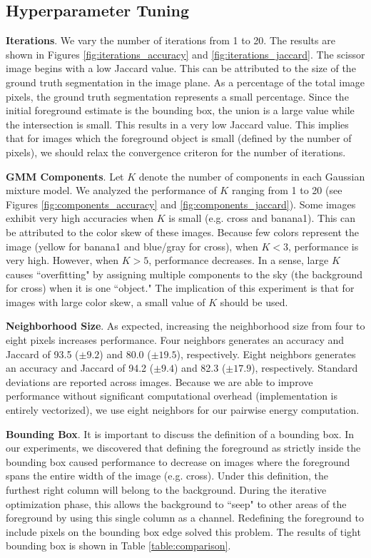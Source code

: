 \documentclass[10pt,twocolumn,letterpaper]{article}
\begin{document}
\subsection{Hyperparameter Tuning}
\textbf{Iterations}. We vary the number of iterations from 1 to 20. The results are shown in Figures \ref{fig:iterations_accuracy} and \ref{fig:iterations_jaccard}. The scissor image begins with a low Jaccard value. This can be attributed to the size of the ground truth segmentation in the image plane. As a percentage of the total image pixels, the ground truth segmentation represents a small percentage. Since the initial foreground estimate is the bounding box, the union is a large value while the intersection is small. This results in a very low Jaccard value. This implies that for images which the foreground object is small (defined by the number of pixels), we should relax the convergence criteron for the number of iterations.

\textbf{GMM Components}. Let $K$ denote the number of components in each Gaussian mixture model. We analyzed the performance of $K$ ranging from 1 to 20 (see Figures \ref{fig:components_accuracy} and \ref{fig:components_jaccard}). Some images exhibit very high accuracies when $K$ is small (e.g. cross and banana1). This can be attributed to the color skew of these images. Because few colors represent the image (yellow for banana1 and blue/gray for cross), when $K<3$, performance is very high. However, when $K>5$, performance decreases. In a sense, large $K$ causes ``overfitting" by assigning multiple components to the sky (the background for cross) when it is one ``object." The implication of this experiment is that for images with large color skew, a small value of $K$ should be used.


\textbf{Neighborhood Size}.
As expected, increasing the neighborhood size from four to eight pixels increases performance. Four neighbors generates an accuracy and Jaccard of 93.5 ($\pm9.2$) and 80.0 ($\pm19.5$), respectively. Eight neighbors generates an accuracy and Jaccard of 94.2 ($\pm 9.4$) and 82.3 ($\pm 17.9$), respectively. Standard deviations are reported across images. Because we are able to improve performance without significant computational overhead (implementation is entirely vectorized), we use eight neighbors for our pairwise energy computation.

\textbf{Bounding Box}. It is important to discuss the definition of a bounding box. In our experiments, we discovered that defining the foreground as strictly inside the bounding box caused performance to decrease on images where the foreground spans the entire width of the image (e.g. cross). Under this definition, the furthest right column will belong to the background. During the iterative optimization phase, this allows the background to ``seep" to other areas of the foreground by using this single column as a channel. Redefining the foreground to include pixels on the bounding box edge solved this problem. The results of tight bounding box is shown in Table \ref{table:comparison}.
\end{document}
